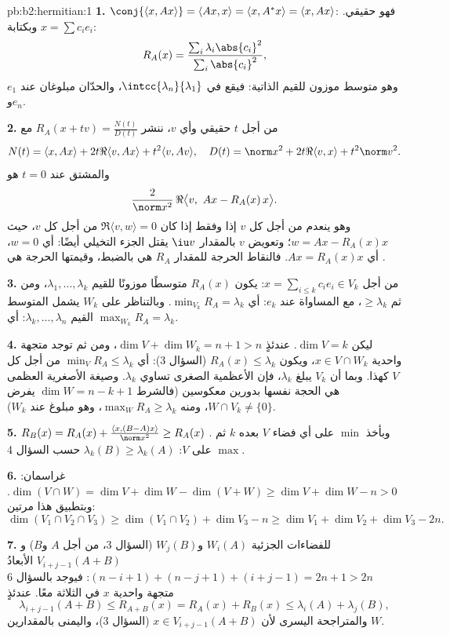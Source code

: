 \begin{solution}{pb:b2:hermitian:1}
\textbf{1.} $\conj{\langle x, Ax\rangle} = \langle Ax, x\rangle
= \langle x, A^*x\rangle = \langle x, Ax\rangle$: فهو حقيقي. وبكتابة
$x = \sum c_ie_i$:
\[
R_A(x) = \frac{\sum_i\lambda_i\abs{c_i}^2}
{\sum_i\abs{c_i}^2} ,
\]
وهو متوسط موزون للقيم الذاتية: فيقع في
$\intcc{\lambda_n}{\lambda_1}$، والحدّان مبلوغان عند
$e_1$ و$e_n$.

\textbf{2.} من أجل $t$ حقيقي وأي $v$، ننشر $R_A(x + tv) =
\frac{N(t)}{D(t)}$ مع
\[
N(t) = \langle x, Ax\rangle + 2t\Re\langle v, Ax\rangle +
t^2\langle v, Av\rangle,
\quad
D(t) = \norm x^2 + 2t\Re\langle v, x\rangle + t^2\norm v^2 .
\]
والمشتق عند $t = 0$ هو
\[
\frac{2}{\norm x^2}\,
\Re\bigl\langle v,\ Ax - R_A(x)\,x\bigr\rangle .
\]
وهو ينعدم من أجل كل $v$ إذا وفقط إذا كان $\Re\langle v, w\rangle = 0$ من أجل
كل $v$، حيث $w = Ax - R_A(x)x$؛ وتعويض $v$ بالمقدار $\iu v$
يقتل الجزء التخيلي أيضًا: أي $w = 0$، أي $Ax = R_A(x)x$.
فالنقاط الحرجة للمقدار $R_A$ هي  بالضبط، وقيمتها
الحرجة هي .

\textbf{3.} من أجل $x = \sum_{i\leq k}c_ie_i \in V_k$: يكون $R_A(x)$
متوسطًا موزونًا للقيم $\lambda_1, \dots, \lambda_k$، ومن ثم
$\geq \lambda_k$، مع المساواة عند $e_k$: أي $\min_{V_k} R_A =
\lambda_k$. وبالتناظر على $W_k$ يشمل المتوسط
القيم $\lambda_k, \dots, \lambda_n$: أي $\max_{W_k}R_A = \lambda_k$.

\textbf{4.} ليكن $\dim V = k$. عندئذٍ $\dim V + \dim W_k = n + 1 >
n$، ومن ثم توجد متجهة واحدية $x \in V \cap W_k$، ويكون $R_A(x) \leq
\lambda_k$ (السؤال 3): أي $\min_{V}R_A \leq \lambda_k$ من أجل كل
$V$ كهذا. وبما أن $V_k$ يبلغ $\lambda_k$، فإن الأعظمية الصغرى تساوي
$\lambda_k$. وصيغة الأصغرية العظمى هي الحجة نفسها بدورين
معكوسين (فالشرط $\dim W = n - k + 1$ يفرض $W \cap V_k \neq
\{0\}$، ومنه $\max_W R_A \geq \lambda_k$، وهو مبلوغ عند $W_k$).

\textbf{5.} $R_B(x) = R_A(x) + \frac{\langle x,
(B-A)x\rangle}{\norm x^2} \geq R_A(x)$ . وبأخذ
$\min$ على أي فضاء $V$ بعده $k$ ثم $\max$ على $V$:
$\lambda_k(B) \geq \lambda_k(A)$ حسب السؤال 4.

\textbf{6.} غراسمان: $\dim(V\cap W) = \dim V + \dim W -
\dim(V + W) \geq \dim V + \dim W - n > 0$. وبتطبيق هذا مرتين:
\[
\dim(V_1\cap V_2\cap V_3)
\geq \dim(V_1\cap V_2) + \dim V_3 - n
\geq \dim V_1 + \dim V_2 + \dim V_3 - 2n .
\]

\textbf{7.} للفضاءات الجزئية $W_i(A)$ و$W_j(B)$ (السؤال 3، من أجل
$A$ و$B$) و$V_{i+j-1}(A+B)$ الأبعادُ $(n-i+1) +
(n-j+1) + (i+j-1) = 2n + 1 > 2n$: فيوجد بالسؤال 6 متجهة واحدية
$x$ في الثلاثة معًا. عندئذٍ
\[
\lambda_{i+j-1}(A+B) \leq R_{A+B}(x)
= R_A(x) + R_B(x) \leq \lambda_i(A) + \lambda_j(B),
\]
والمتراجحة اليسرى لأن $x \in V_{i+j-1}(A+B)$ (السؤال
3)، واليمنى بالمقدارين $W$.


\end{solution}

